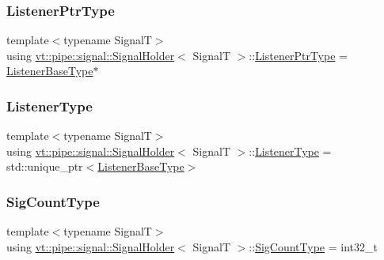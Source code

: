 \subsubsection{\texorpdfstring{Listener\+Ptr\+Type}{ListenerPtrType}}
{\footnotesize\ttfamily template$<$typename SignalT$>$ \\
using \hyperlink{structvt_1_1pipe_1_1signal_1_1_signal_holder}{vt\+::pipe\+::signal\+::\+Signal\+Holder}$<$ SignalT $>$\+::\hyperlink{structvt_1_1pipe_1_1signal_1_1_signal_holder_a68114d1ad5804c71e014736b18e41e08}{Listener\+Ptr\+Type} =  \hyperlink{structvt_1_1pipe_1_1signal_1_1_signal_holder_a84b564235f6d400782769c94a75d6622}{Listener\+Base\+Type}$\ast$}

\mbox{\label{structvt_1_1pipe_1_1signal_1_1_signal_holder_a23af418129e6e8ecb4ee9621e6fd6f90}} 
\subsubsection{\texorpdfstring{Listener\+Type}{ListenerType}}
{\footnotesize\ttfamily template$<$typename SignalT$>$ \\
using \hyperlink{structvt_1_1pipe_1_1signal_1_1_signal_holder}{vt\+::pipe\+::signal\+::\+Signal\+Holder}$<$ SignalT $>$\+::\hyperlink{structvt_1_1pipe_1_1signal_1_1_signal_holder_a23af418129e6e8ecb4ee9621e6fd6f90}{Listener\+Type} =  std\+::unique\+\_\+ptr$<$\hyperlink{structvt_1_1pipe_1_1signal_1_1_signal_holder_a84b564235f6d400782769c94a75d6622}{Listener\+Base\+Type}$>$}

\mbox{\label{structvt_1_1pipe_1_1signal_1_1_signal_holder_aced54515f402b63f6dea174e5b027c81}} 
\subsubsection{\texorpdfstring{Sig\+Count\+Type}{SigCountType}}
{\footnotesize\ttfamily template$<$typename SignalT$>$ \\
using \hyperlink{structvt_1_1pipe_1_1signal_1_1_signal_holder}{vt\+::pipe\+::signal\+::\+Signal\+Holder}$<$ SignalT $>$\+::\hyperlink{structvt_1_1pipe_1_1signal_1_1_signal_holder_aced54515f402b63f6dea174e5b027c81}{Sig\+Count\+Type} =  int32\+\_\+t}

